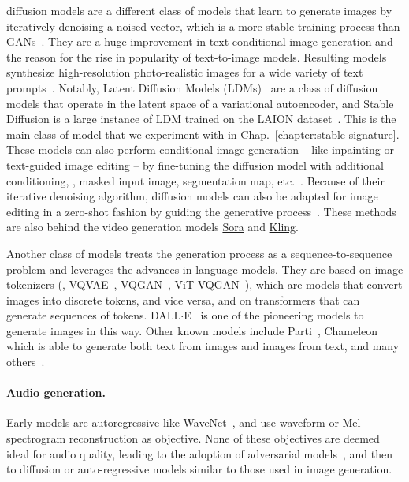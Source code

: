 \Glspl*{diffusion model} are a different class of models that learn to generate images by iteratively denoising a noised vector, which is a more stable training process than GANs~\citep{dhariwal2021diffusion, ho2020denoising, nichol2021improved, song2020denoising}.
They are a huge improvement in text-conditional image generation and the reason for the rise in popularity of text-to-image models.
Resulting models synthesize high-resolution photo-realistic images for a wide variety of text prompts~\citep{balaji2022ediffi, ho2022imagenvideo, ramesh2022hierarchical, saharia2022photorealistic}. 
Notably, Latent Diffusion Models (\Glspl*{LDM})~\citep{rombach2022high} are a class of diffusion models that operate in the latent space of a variational autoencoder, and Stable Diffusion is a large instance of LDM trained on the LAION dataset~\citep{schuhmann2021laion, schuhmann2022laion}.
This is the main class of model that we experiment with in Chap.~\ref{chapter:stable-signature}.
These models can also perform conditional image generation -- like inpainting or text-guided image editing -- by fine-tuning the diffusion model with additional conditioning, \eg, masked input image, segmentation map, etc.~\citep{lugmayr2022repaint, saharia2022palette}. 
Because of their iterative denoising algorithm, diffusion models can also be adapted for image editing in a zero-shot fashion by guiding the generative process~\citep{couairon2022diffedit, hertz2022prompt, kawar2022imagic, mokady2022null, valevski2022unitune,  wu2022unifying}.
These methods are also behind the video generation models \href{https://openai.com/index/sora/}{Sora} and \href{https://kling.kuaishou.com/en}{Kling}.

Another class of models treats the generation process as a sequence-to-sequence problem and leverages the advances in language models.
They are based on image tokenizers (\eg, VQVAE~\citep{van2017neural}, VQGAN~\citep{esser2021taming}, ViT-VQGAN~\citep{yu2021vector}), which are models that convert images into discrete tokens, and vice versa, and on transformers that can generate sequences of tokens.
DALL$\cdot$E~\citep{ramesh2021zero} is one of the pioneering models to generate images in this way.
Other known models include Parti~\citep{yu2022scaling}, Chameleon~\citep{team2024chameleon} which is able to generate both text from images and images from text, and many others~\citep{chen2020generative, ding2021cogview, esser2021taming, gafni2022make, singer2022makeavideo}. 


\paragraph{Audio generation.}
Early models are autoregressive like WaveNet~\citep{wavnet, wang2017tacotron, shen2018natural}, and use waveform or Mel spectrogram reconstruction as objective. 
None of these objectives are deemed ideal for audio quality, leading to the adoption of adversarial models~\citep{hifigan, melgan}, and then to diffusion or auto-regressive models similar to those used in image generation.

